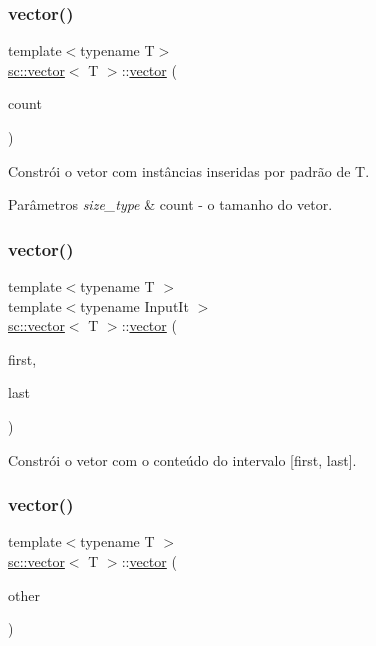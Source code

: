 \subsubsection{\texorpdfstring{vector()}{vector()}\hspace{0.1cm}{\footnotesize\ttfamily [2/11]}}
{\footnotesize\ttfamily template$<$typename T$>$ \\
\mbox{\hyperlink{classsc_1_1vector}{sc\+::vector}}$<$ T $>$\+::\mbox{\hyperlink{classsc_1_1vector}{vector}} (\begin{DoxyParamCaption}\item[{size\+\_\+type}]{count }\end{DoxyParamCaption})}

Constrói o vetor com instâncias inseridas por padrão de T. 
\begin{DoxyParams}{Parâmetros}
{\em size\+\_\+type} & count -\/ o tamanho do vetor. \\
\hline
\end{DoxyParams}
\mbox{\label{classsc_1_1vector_ab58c55200c6a120b9d24793a271512fb}} 
\subsubsection{\texorpdfstring{vector()}{vector()}\hspace{0.1cm}{\footnotesize\ttfamily [3/11]}}
{\footnotesize\ttfamily template$<$typename T $>$ \\
template$<$typename Input\+It $>$ \\
\mbox{\hyperlink{classsc_1_1vector}{sc\+::vector}}$<$ T $>$\+::\mbox{\hyperlink{classsc_1_1vector}{vector}} (\begin{DoxyParamCaption}\item[{Input\+It}]{first,  }\item[{Input\+It}]{last }\end{DoxyParamCaption})}

Constrói o vetor com o conteúdo do intervalo \mbox{[}first, last\mbox{]}. \mbox{\label{classsc_1_1vector_aed6fb1e650e0256b483ce754a473c4c2}} 
\subsubsection{\texorpdfstring{vector()}{vector()}\hspace{0.1cm}{\footnotesize\ttfamily [4/11]}}
{\footnotesize\ttfamily template$<$typename T $>$ \\
\mbox{\hyperlink{classsc_1_1vector}{sc\+::vector}}$<$ T $>$\+::\mbox{\hyperlink{classsc_1_1vector}{vector}} (\begin{DoxyParamCaption}\item[{const \mbox{\hyperlink{classsc_1_1vector}{vector}}$<$ T $>$ \&}]{other }\end{DoxyParamCaption})}

